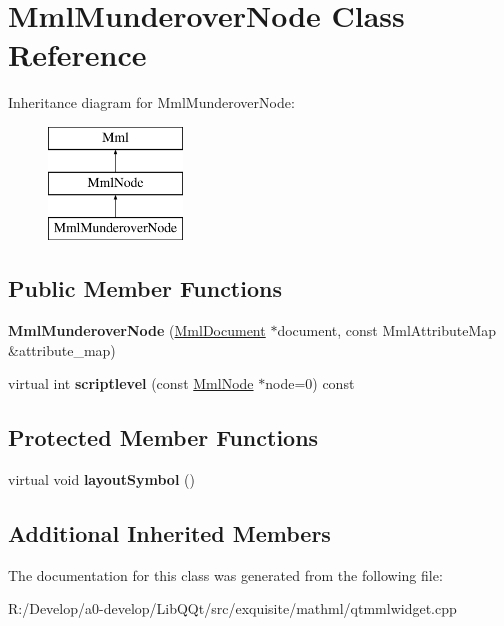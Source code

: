 \hypertarget{class_mml_munderover_node}{}\section{Mml\+Munderover\+Node Class Reference}
\label{class_mml_munderover_node}
Inheritance diagram for Mml\+Munderover\+Node\+:\begin{figure}[H]
\begin{center}
\leavevmode
\includegraphics[height=3.000000cm]{class_mml_munderover_node}
\end{center}
\end{figure}
\subsection*{Public Member Functions}
\begin{DoxyCompactItemize}
\item 
\mbox{\label{class_mml_munderover_node_a579d6a9423ccef8a17f62299e1661c0d}} 
{\bfseries Mml\+Munderover\+Node} (\mbox{\hyperlink{class_mml_document}{Mml\+Document}} $\ast$document, const Mml\+Attribute\+Map \&attribute\+\_\+map)
\item 
\mbox{\label{class_mml_munderover_node_a169107b7a1b4a17de227fd63c50a0baa}} 
virtual int {\bfseries scriptlevel} (const \mbox{\hyperlink{class_mml_node}{Mml\+Node}} $\ast$node=0) const
\end{DoxyCompactItemize}
\subsection*{Protected Member Functions}
\begin{DoxyCompactItemize}
\item 
\mbox{\label{class_mml_munderover_node_ae58e990a283571f0e9d5cb03dcf3c489}} 
virtual void {\bfseries layout\+Symbol} ()
\end{DoxyCompactItemize}
\subsection*{Additional Inherited Members}


The documentation for this class was generated from the following file\+:\begin{DoxyCompactItemize}
\item 
R\+:/\+Develop/a0-\/develop/\+Lib\+Q\+Qt/src/exquisite/mathml/qtmmlwidget.\+cpp\end{DoxyCompactItemize}
